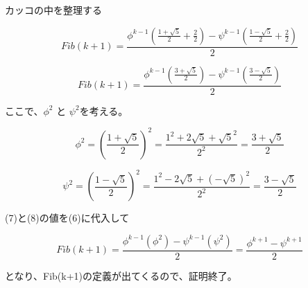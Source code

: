 \documentclass[10pt]{jarticle}
\begin{document}
カッコの中を整理する

\begin{displaymath}
	Fib(k+1) =  \frac{\phi^{k-1}(\frac{1+\sqrt{5}}{2} + \frac{2}{2}) - \psi^{k-1}(\frac{1-\sqrt{5}}{2} + \frac{2}{2})}{2}
\end{displaymath}

\begin{equation}
	Fib(k+1) =  \frac{\phi^{k-1}(\frac{3+\sqrt{5}}{2}) - \psi^{k-1}(\frac{3-\sqrt{5}}{2})}{2}
\end{equation}

ここで、$\phi^2$ と $\psi^2$を考える。

\begin{equation}
	\phi^2 = \left(\frac{1 + \sqrt{5}}{2}\right)^2 = \frac{1^2 + 2\sqrt{5} + \sqrt{5}^2}{2^2} = \frac{3 + \sqrt{5}}{2}
\end{equation}

\begin{equation}
	\psi^2 = \left(\frac{1 - \sqrt{5}}{2}\right)^2 = \frac{1^2 - 2\sqrt{5} + (-\sqrt{5})^2}{2^2} = \frac{3 - \sqrt{5}}{2}
\end{equation}

(7)と(8)の値を(6)に代入して

\begin{equation}
	Fib(k+1) =  \frac{\phi^{k-1}(\phi^2) - \psi^{k-1}(\psi^2)}{2} = \frac{\phi^{k+1} - \psi^{k+1}}{2}
\end{equation}

となり、Fib(k+1)の定義が出てくるので、証明終了。
\end{document}
